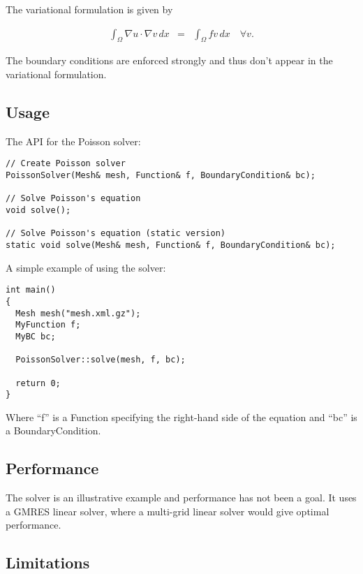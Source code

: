 The variational formulation is given by

\begin{equation} \label{eq:poisson-varform}
\begin{array}{rcl}
  \int_{\Omega} \nabla u \cdot \nabla v \, dx &=&
  \int_{\Omega} fv \, dx 
  \quad \forall v.
\end{array}
\end{equation}

The boundary conditions are enforced strongly and thus don't appear in
the variational formulation.

\subsection{Usage}

The API for the Poisson solver:

\begin{verbatim}
// Create Poisson solver
PoissonSolver(Mesh& mesh, Function& f, BoundaryCondition& bc);
    
// Solve Poisson's equation
void solve();

// Solve Poisson's equation (static version)
static void solve(Mesh& mesh, Function& f, BoundaryCondition& bc);
\end{verbatim}

A simple example of using the solver:

\begin{verbatim}
int main()
{
  Mesh mesh("mesh.xml.gz");
  MyFunction f;
  MyBC bc;
  
  PoissonSolver::solve(mesh, f, bc);
  
  return 0;
}
\end{verbatim}

Where ``f'' is a Function specifying the right-hand side of the
equation and ``bc'' is a BoundaryCondition.

\subsection{Performance}

The solver is an illustrative example and performance has not been a
goal. It uses a GMRES linear solver, where a multi-grid linear solver
would give optimal performance.

\subsection{Limitations}

